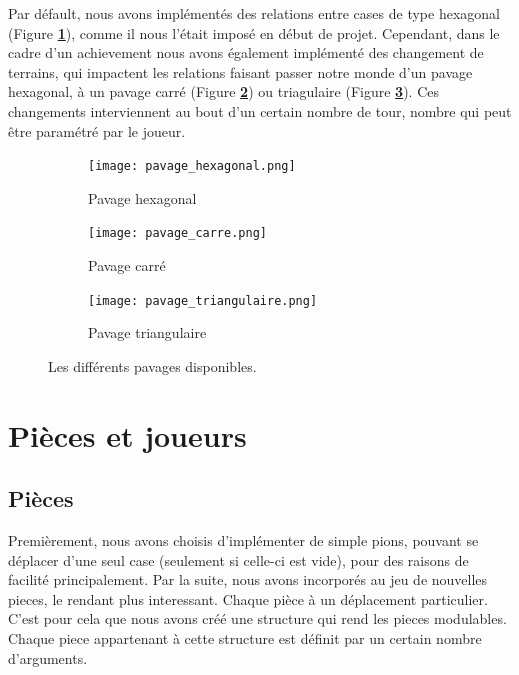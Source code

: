         Par défault, nous avons implémentés des relations entre cases de type hexagonal (Figure \textbf{\ref{fig:pavage_hexagonal}}), comme il nous l'était imposé en début de projet. Cependant, dans le cadre d'un achievement nous avons également implémenté des changement de terrains, qui impactent les relations faisant passer notre monde d'un pavage hexagonal, à un pavage carré (Figure \textbf{\ref{fig:pavage_carre}}) ou triagulaire (Figure \textbf{\ref{fig:pavage_triangulaire}}). Ces changements interviennent au bout d'un certain nombre de tour, nombre qui peut être paramétré par le joueur.
        
        \begin{figure}[H]
            \centering
            \begin{subfigure}{0.3\textwidth}
                \centering
                \texttt{[image: pavage\_hexagonal.png]}
                \caption{Pavage hexagonal\footnotemark{}}
                \label{fig:pavage_hexagonal}
            \end{subfigure}
            \quad
            \begin{subfigure}{0.3\textwidth}
                \centering
                \texttt{[image: pavage\_carre.png]}
                \caption{Pavage carré\footnotemark{}}
                \label{fig:pavage_carre}
            \end{subfigure}
            \quad 
            \begin{subfigure}{0.3\textwidth}
                \centering
                \texttt{[image: pavage\_triangulaire.png]}
                \caption{Pavage triangulaire\footnotemark{}}
                \label{fig:pavage_triangulaire}
            \end{subfigure}
            \caption{Les différents pavages disponibles.}
            \label{label_de_la_figure 1}
        \end{figure}

\section{Pièces et joueurs}
    \subsection{Pièces}\label{part:pawns}
        Premièrement, nous avons choisis d'implémenter de simple pions, pouvant se déplacer d'une seul case (seulement si celle-ci est vide), pour des raisons de facilité principalement. Par la suite, nous avons incorporés au jeu de nouvelles pieces, le rendant plus interessant. Chaque pièce à un déplacement particulier. \\ 
        C'est pour cela que nous avons créé une structure qui rend les pieces modulables. Chaque piece appartenant à cette structure est définit par un certain nombre d'arguments.

